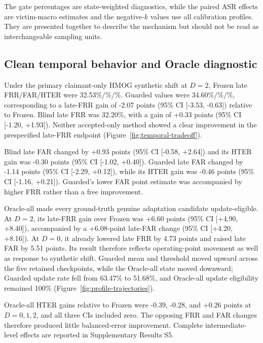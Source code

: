 \documentclass[technologies,article,submit,moreauthors]{Definitions/mdpi}
\begin{document}
The gate percentages are state-weighted diagnostics, while the paired ASR effects are victim-macro estimates and the negative-\(k\) values use all calibration profiles. They are presented together to describe the mechanism but should not be read as interchangeable sampling units.

\subsection{Clean temporal behavior and Oracle diagnostic}\label{sec:clean-temporal-behavior-and-oracle-diagnostic}

Under the primary claimant-only HMOG synthetic shift at \(D=2\), Frozen late FRR/\allowbreak FAR/\allowbreak HTER were 32.53\%/\%/\%. Guarded values were 34.60\%/\%/\%, corresponding to a late-FRR gain of -2.07 points (95\% CI {[}-3.53, -0.63{]}) relative to Frozen. Blind late FRR was 32.20\%, with a gain of +0.33 points (95\% CI {[}-1.20, +1.93{]}). Neither accepted-only method showed a clear improvement in the prespecified late-FRR endpoint (Figure~\ref{fig:temporal-tradeoff}).

Blind late FAR changed by +0.93 points (95\% CI {[}-0.58, +2.64{]}) and its HTER gain was -0.30 points (95\% CI {[}-1.02, +0.40{]}). Guarded late FAR changed by -1.14 points (95\% CI {[}-2.29, +0.12{]}), while its HTER gain was -0.46 points (95\% CI {[}-1.16, +0.21{]}). Guarded's lower FAR point estimate was accompanied by higher FRR rather than a free improvement.

Oracle-all made every ground-truth genuine adaptation candidate update-eligible. At \(D=2\), its late-FRR gain over Frozen was +6.60 points (95\% CI {[}+4.90, +8.40{]}), accompanied by a +6.08-point late-FAR change (95\% CI {[}+4.20, +8.16{]}). At \(D=0\), it already lowered late FRR by 4.73 points and raised late FAR by 5.51 points. Its result therefore reflects operating-point movement as well as response to synthetic shift. Guarded mean and threshold moved upward across the five retained checkpoints, while the Oracle-all state moved downward; Guarded update rate fell from 63.47\% to 51.68\%, and Oracle-all update eligibility remained 100\% (Figure~\ref{fig:profile-trajectories}).

Oracle-all HTER gains relative to Frozen were -0.39, -0.28, and +0.26 points at \(D=0,1,2\), and all three CIs included zero. The opposing FRR and FAR changes therefore produced little balanced-error improvement. Complete intermediate-level effects are reported in Supplementary Results S5.
\end{document}
